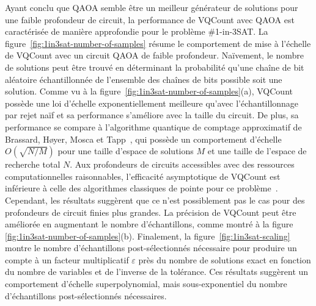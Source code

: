 Ayant conclu que QAOA semble être un meilleur générateur de solutions pour une faible profondeur de circuit, la performance de VQCount avec QAOA est caractérisée de manière approfondie pour le problème \#1-in-3SAT. La figure~\ref{fig:1in3sat-number-of-samples} résume le comportement de mise à l'échelle de VQCount avec un circuit QAOA de faible profondeur. Naïvement, le nombre de solutions peut être trouvé en déterminant la probabilité qu'une chaîne de bit aléatoire échantillonnée de l'ensemble des chaînes de bits possible soit une solution. Comme vu à la figure~\ref{fig:1in3sat-number-of-samples}(a), VQCount possède une loi d'échelle exponentiellement meilleure qu'avec l'échantillonnage par rejet naïf et sa performance s'améliore avec la taille du circuit. De plus, sa performance se compare à l'algorithme quantique de comptage approximatif de Brassard, H\o yer, Mosca et Tapp~\cite{brassardQuantumAmplitudeAmplification2002}, qui possède un comportement d'échelle $O(\sqrt{N/M})$ pour une taille d'espace de solutions $M$ et une taille de l'espace de recherche total $N$. Aux profondeurs de circuits accessibles avec des ressources computationnelles raisonnables, l'efficacité asymptotique de VQCount est inférieure à celle des algorithmes classiques de pointe pour ce problème~\cite{kourtisFastCountingTensor2019}. Cependant, les résultats suggèrent que ce n'est possiblement pas le cas pour des profondeurs de circuit finies plus grandes. La précision de VQCount peut être améliorée en augmentant le nombre d'échantillons, comme montré à la figure \ref{fig:1in3sat-number-of-samples}(b). Finalement, la figure~\ref{fig:1in3sat-scaling} montre le nombre d'échantillons post-sélectionnés nécessaire pour produire un compte à un facteur multiplicatif $\varepsilon$ près du nombre de solutions exact en fonction du nombre de variables et de l'inverse de la tolérance. Ces résultats suggèrent un comportement d'échelle superpolynomial, mais sous-exponentiel du nombre d'échantillons post-sélectionnés nécessaires. 

